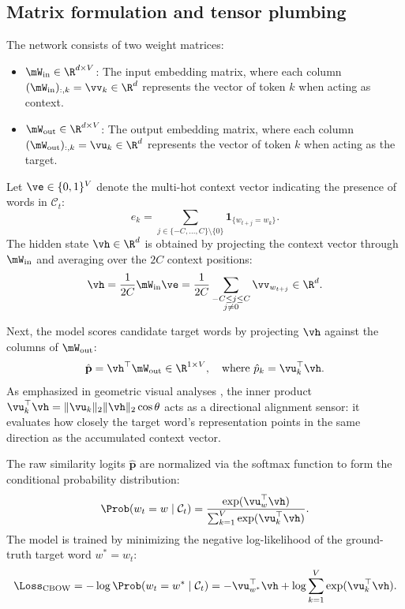 \documentclass[../../main.tex]{subfiles}
\begin{document}
\subsection{Matrix formulation and tensor plumbing}
\label{subsec:cbow_math_formulation}

The network consists of two weight matrices:
\begin{itemize}
    \item $\mW_{\text{in}} \in \R^{d \times V}$: The input embedding matrix, where each column $(\mW_{\text{in}})_{:, k} = \vv_k \in \R^d$ represents the vector of token $k$ when acting as context.
    \item $\mW_{\text{out}} \in \R^{d \times V}$: The output embedding matrix, where each column $(\mW_{\text{out}})_{:, k} = \vu_k \in \R^d$ represents the vector of token $k$ when acting as the target.
\end{itemize}

Let $\ve \in \{0, 1\}^V$ denote the multi-hot context vector indicating the presence of words in $\mathcal{C}_t$:
\begin{equation}
\label{eq:context_indicator}
e_k = \sum_{j \in \{-C, \dots, C\} \setminus \{0\}} \mathbf{1}_{\{w_{t+j} = w_k\}}.
\end{equation}
The hidden state $\vh \in \R^d$ is obtained by projecting the context vector through $\mW_{\text{in}}$ and averaging over the $2C$ context positions:
\begin{equation}
\label{eq:cbow_hidden_avg}
\vh = \frac{1}{2C} \mW_{\text{in}} \ve = \frac{1}{2C} \sum_{\substack{-C \le j \le C \\ j \neq 0}} \vv_{w_{t+j}} \in \R^d.
\end{equation}

Next, the model scores candidate target words by projecting $\vh$ against the columns of $\mW_{\text{out}}$:
\begin{equation}
\label{eq:cbow_logits}
\hat{\mathbf{p}} = \vh^\top \mW_{\text{out}} \in \R^{1 \times V}, \quad \text{where } \hat{p}_k = \vu_k^\top \vh.
\end{equation}
As emphasized in geometric visual analyses \cite{sanderson2024embeddings}, the inner product $\vu_k^\top \vh = \|\vu_k\|_2 \|\vh\|_2 \cos \theta$ acts as a directional alignment sensor: it evaluates how closely the target word's representation points in the same direction as the accumulated context vector.

The raw similarity logits $\hat{\mathbf{p}}$ are normalized via the softmax function to form the conditional probability distribution:
\begin{equation}
\label{eq:cbow_softmax}
\Prob(w_t = w \mid \mathcal{C}_t) = \frac{\exp(\vu_w^\top \vh)}{\sum_{k=1}^V \exp(\vu_k^\top \vh)}.
\end{equation}
The model is trained by minimizing the negative log-likelihood of the ground-truth target word $w^* = w_t$:
\begin{equation}
\label{eq:cbow_loss}
\Loss_{\text{CBOW}} = -\log \Prob(w_t = w^* \mid \mathcal{C}_t) = -\vu_{w^*}^\top \vh + \log \sum_{k=1}^V \exp(\vu_k^\top \vh).
\end{equation}
\end{document}
